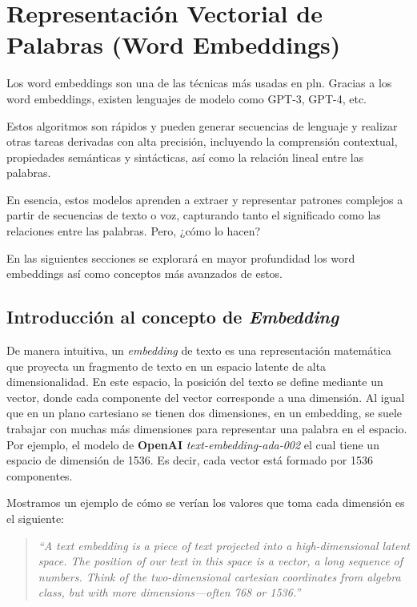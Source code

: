 \chapter{Representación Vectorial de Palabras (Word Embeddings)}
\label{chap:word_embeddings}

Los word embeddings son una de las técnicas más usadas en \gls{pln}. Gracias a los word embeddings, existen lenguajes de modelo como GPT-3, GPT-4, etc.

Estos algoritmos son rápidos y pueden generar secuencias de lenguaje y realizar otras tareas derivadas con alta precisión, incluyendo la comprensión contextual, propiedades semánticas y sintácticas, así como la relación lineal entre las palabras.

En esencia, estos modelos aprenden a extraer y representar patrones complejos a partir de secuencias de texto o voz, capturando tanto el significado como las relaciones entre las palabras. Pero, ¿cómo lo hacen?

En las siguientes secciones se explorará en mayor profundidad los word embeddings así como conceptos más avanzados de estos.

\section{Introducción al concepto de \textit{Embedding}}

De manera intuitiva, un \textit{embedding} de texto es una representación matemática que proyecta un fragmento de texto en un espacio latente de alta dimensionalidad. En este espacio, la posición del texto se define mediante un vector, donde cada componente del vector corresponde a una dimensión. Al igual que en un plano cartesiano se tienen dos dimensiones, en un embedding, se suele trabajar con muchas más dimensiones para representar una palabra en el espacio\cite{henner_intuitive_embeddings_2023}. Por ejemplo, el modelo de \textbf{OpenAI} \textit{text-embedding-ada-002} el cual tiene un espacio de dimensión de 1536. Es decir, cada vector está formado por 1536 componentes.

Mostramos un ejemplo de cómo se verían los valores que toma cada dimensión es el siguiente:

\begin{quote}
  \textit{``A text embedding is a piece of text projected into a high-dimensional latent space. The position of our text in this space is a vector, a long sequence of numbers. Think of the two-dimensional cartesian coordinates from algebra class, but with more dimensions---often 768 or 1536.''} \cite{henner_intuitive_embeddings_2023}
\end{quote}

